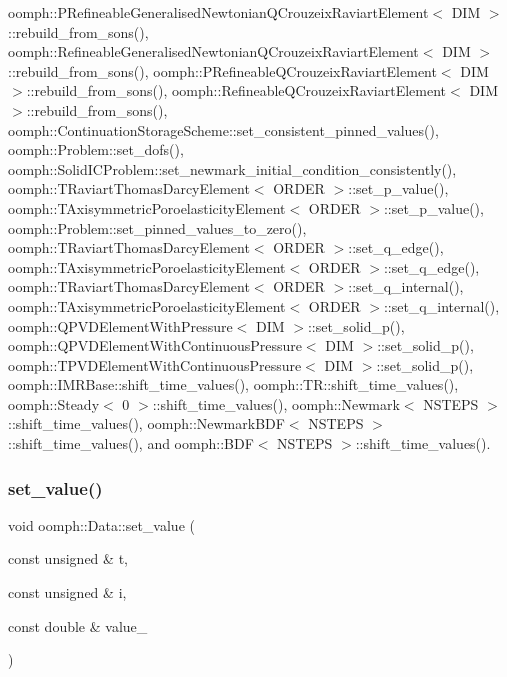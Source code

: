 oomph\+::\+P\+Refineable\+Generalised\+Newtonian\+Q\+Crouzeix\+Raviart\+Element$<$ D\+I\+M $>$\+::rebuild\+\_\+from\+\_\+sons(), oomph\+::\+Refineable\+Generalised\+Newtonian\+Q\+Crouzeix\+Raviart\+Element$<$ D\+I\+M $>$\+::rebuild\+\_\+from\+\_\+sons(), oomph\+::\+P\+Refineable\+Q\+Crouzeix\+Raviart\+Element$<$ D\+I\+M $>$\+::rebuild\+\_\+from\+\_\+sons(), oomph\+::\+Refineable\+Q\+Crouzeix\+Raviart\+Element$<$ D\+I\+M $>$\+::rebuild\+\_\+from\+\_\+sons(), oomph\+::\+Continuation\+Storage\+Scheme\+::set\+\_\+consistent\+\_\+pinned\+\_\+values(), oomph\+::\+Problem\+::set\+\_\+dofs(), oomph\+::\+Solid\+I\+C\+Problem\+::set\+\_\+newmark\+\_\+initial\+\_\+condition\+\_\+consistently(), oomph\+::\+T\+Raviart\+Thomas\+Darcy\+Element$<$ O\+R\+D\+E\+R $>$\+::set\+\_\+p\+\_\+value(), oomph\+::\+T\+Axisymmetric\+Poroelasticity\+Element$<$ O\+R\+D\+E\+R $>$\+::set\+\_\+p\+\_\+value(), oomph\+::\+Problem\+::set\+\_\+pinned\+\_\+values\+\_\+to\+\_\+zero(), oomph\+::\+T\+Raviart\+Thomas\+Darcy\+Element$<$ O\+R\+D\+E\+R $>$\+::set\+\_\+q\+\_\+edge(), oomph\+::\+T\+Axisymmetric\+Poroelasticity\+Element$<$ O\+R\+D\+E\+R $>$\+::set\+\_\+q\+\_\+edge(), oomph\+::\+T\+Raviart\+Thomas\+Darcy\+Element$<$ O\+R\+D\+E\+R $>$\+::set\+\_\+q\+\_\+internal(), oomph\+::\+T\+Axisymmetric\+Poroelasticity\+Element$<$ O\+R\+D\+E\+R $>$\+::set\+\_\+q\+\_\+internal(), oomph\+::\+Q\+P\+V\+D\+Element\+With\+Pressure$<$ D\+I\+M $>$\+::set\+\_\+solid\+\_\+p(), oomph\+::\+Q\+P\+V\+D\+Element\+With\+Continuous\+Pressure$<$ D\+I\+M $>$\+::set\+\_\+solid\+\_\+p(), oomph\+::\+T\+P\+V\+D\+Element\+With\+Continuous\+Pressure$<$ D\+I\+M $>$\+::set\+\_\+solid\+\_\+p(), oomph\+::\+I\+M\+R\+Base\+::shift\+\_\+time\+\_\+values(), oomph\+::\+T\+R\+::shift\+\_\+time\+\_\+values(), oomph\+::\+Steady$<$ 0 $>$\+::shift\+\_\+time\+\_\+values(), oomph\+::\+Newmark$<$ N\+S\+T\+E\+P\+S $>$\+::shift\+\_\+time\+\_\+values(), oomph\+::\+Newmark\+B\+D\+F$<$ N\+S\+T\+E\+P\+S $>$\+::shift\+\_\+time\+\_\+values(), and oomph\+::\+B\+D\+F$<$ N\+S\+T\+E\+P\+S $>$\+::shift\+\_\+time\+\_\+values().

\mbox{\label{classoomph_1_1Data_a39c1ab8b0a45af29101c606b965bed07}} 
\subsubsection{\texorpdfstring{set\+\_\+value()}{set\_value()}\hspace{0.1cm}{\footnotesize\ttfamily [2/2]}}
{\footnotesize\ttfamily void oomph\+::\+Data\+::set\+\_\+value (\begin{DoxyParamCaption}\item[{const unsigned \&}]{t,  }\item[{const unsigned \&}]{i,  }\item[{const double \&}]{value\+\_\+ }\end{DoxyParamCaption})\hspace{0.3cm}{\ttfamily [inline]}}



